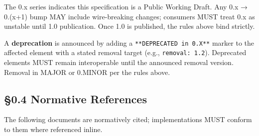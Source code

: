 \documentclass[11pt]{article}
\begin{document}
The 0.x series indicates this specification is a Public Working Draft. Any 0.x → 0.(x+1) bump MAY include wire-breaking changes; consumers MUST treat 0.x as unstable until 1.0 publication. Once 1.0 is published, the rules above bind strictly.


A \textbf{deprecation} is announced by adding a \texttt{**DEPRECATED in 0.X**} marker to the affected element with a stated removal target (e.g., \texttt{removal: 1.2}). Deprecated elements MUST remain interoperable until the announced removal version. Removal in MAJOR or 0.MINOR per the rules above.



\subsection*{§0.4 Normative References}


The following documents are normatively cited; implementations MUST conform to them where referenced inline.
\end{document}
